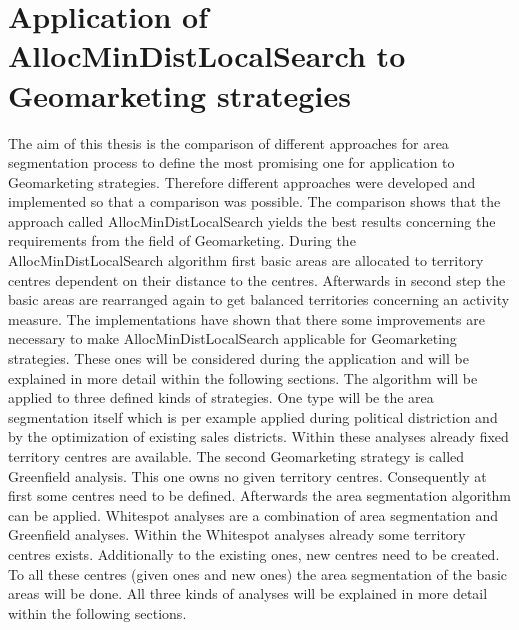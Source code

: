 \section{Application of AllocMinDistLocalSearch to Geomarketing strategies}
The aim of this thesis is the comparison of different approaches for area segmentation process to define the most promising one for application to Geomarketing strategies. Therefore different approaches were developed and implemented so that a comparison was possible. The comparison shows that the approach called AllocMinDistLocalSearch yields the best results concerning the requirements from the field of Geomarketing. During the AllocMinDistLocalSearch algorithm first basic areas are allocated to territory centres dependent on their distance to the centres. Afterwards in second step the basic areas are rearranged again to get balanced territories concerning an activity measure. The implementations have shown that there some improvements are necessary to make AllocMinDistLocalSearch applicable for Geomarketing strategies. These ones will be considered during the application and will be explained in more detail within the following sections. The algorithm will be applied to three defined kinds of strategies. One type will be the area segmentation itself which is per example applied during political distriction and by the optimization of existing sales districts. Within these analyses already fixed territory centres are available. The second Geomarketing strategy is called Greenfield analysis. This one owns no given territory centres. Consequently at first some centres need to be defined. Afterwards the area segmentation algorithm can be applied. Whitespot analyses are a combination of area segmentation and Greenfield analyses. Within the Whitespot analyses already some territory centres exists. Additionally to the existing ones, new centres need to be created. To all these centres (given ones and new ones) the area segmentation of the basic areas will be done. All three kinds of analyses will be explained in more detail within the following sections. 


